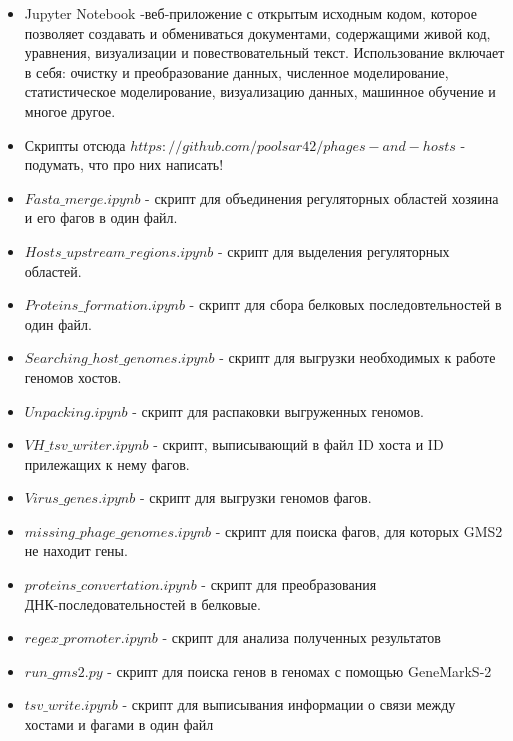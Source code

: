 \documentclass[14pt]{extarticle}
\begin{document}
\begin{itemize}
    \item Jupyter Notebook -веб-приложение с открытым исходным кодом, которое позволяет создавать и обмениваться
    документами, содержащими живой код, уравнения, визуализации и повествовательный текст. Использование включает в 
    себя:
    очистку и преобразование данных, численное моделирование, статистическое моделирование, визуализацию данных, 
    машинное
    обучение и многое другое. \cite{jupyter}
    
    \item Скрипты отсюда \(https://github.com/poolsar42/phages-and-hosts\) - подумать, что про них написать!
    \cite{github}
    
    \item \(Fasta\_merge.ipynb\) - скрипт для объединения регуляторных областей хозяина и его фагов в один файл.
    \item \(Hosts\_upstream\_regions.ipynb\) - скрипт для выделения регуляторных областей.
    \item \(Proteins\_formation.ipynb\) - скрипт для сбора белковых последовтельностей в один файл.
    \item \(Searching\_host\_genomes.ipynb\) - скрипт для выгрузки необходимых к работе геномов хостов.
    \item \(Unpacking.ipynb\) - скрипт для распаковки выгруженных геномов.
    \item \(VH\_tsv\_writer.ipynb\) - скрипт, выписывающий в файл ID хоста и ID прилежащих к нему фагов.
    \item \(Virus\_genes.ipynb\) - скрипт для выгрузки геномов фагов.
    \item \(missing\_phage\_genomes.ipynb\) - скрипт для поиска фагов, для которых GMS2 не находит гены.
    \item \(proteins\_convertation.ipynb \) - скрипт для преобразования \\ ДНК-последовательностей
                                в белковые.
    \item \(regex\_promoter.ipynb \) - скрипт для анализа полученных результатов
    \item \(run\_gms2.py\) - скрипт для поиска генов в геномах с помощью GeneMarkS-2
    \item \(tsv\_write.ipynb\) - скрипт для выписывания информации о связи между хостами и фагами в один файл
\end{itemize}
\end{document}
